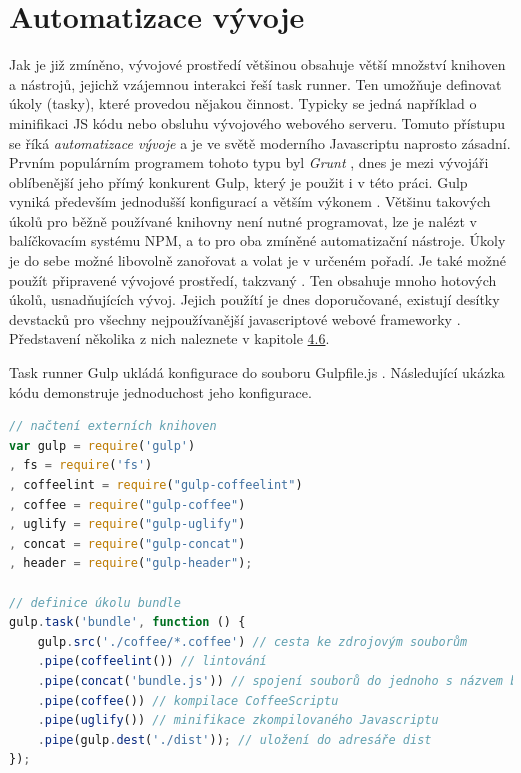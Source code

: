 \section{Automatizace vývoje}
\label{sec:task_runner}
Jak je již zmíněno, vývojové prostředí většinou obsahuje větší množství knihoven a nástrojů, jejichž vzájemnou interakci řeší task runner. Ten umožňuje definovat úkoly (tasky), které provedou nějakou činnost. Typicky se jedná například o minifikaci JS kódu nebo obsluhu vývojového webového serveru. Tomuto přístupu se říká \textit{automatizace vývoje} a je ve světě moderního Javascriptu naprosto zásadní. Prvním populárním programem tohoto typu byl \textit{Grunt} \cite{grunt}, dnes je mezi vývojáři oblíbenější jeho přímý konkurent Gulp, který je použit i v této práci. Gulp vyniká především jednodušší konfigurací a větším výkonem \cite{gulp}. Většinu takových úkolů pro běžně používané knihovny není nutné programovat, lze je nalézt v balíčkovacím systému NPM, a to pro oba zmíněné automatizační nástroje. Úkoly je do sebe možné libovolně zanořovat a volat je v určeném pořadí.  Je také možné použít připravené vývojové prostředí, takzvaný . Ten obsahuje mnoho hotových úkolů, usnadňujících vývoj. Jejich použítí je dnes doporučované, existují desítky devstacků pro všechny nejpoužívanější javascriptové webové frameworky \cite{task_runners}. Představení několika z nich naleznete v kapitole \hyperref[sec:devstacks]{4.6}.

\vspace{3mm}
\noindent Task runner Gulp ukládá konfigurace do souboru Gulpfile.js \cite{gulp} \cite{gulp_web}. Následující ukázka kódu demonstruje jednoduchost jeho konfigurace.

\begin{lstlisting}[language=Javascript,caption={Ukázka konfigurace task runneru Gulp \cite{gulp}}]
// načtení externích knihoven
var gulp = require('gulp')
, fs = require('fs')
, coffeelint = require("gulp-coffeelint")
, coffee = require("gulp-coffee")
, uglify = require("gulp-uglify")
, concat = require("gulp-concat")
, header = require("gulp-header");
 
// definice úkolu bundle
gulp.task('bundle', function () {
    gulp.src('./coffee/*.coffee') // cesta ke zdrojovým souborům
    .pipe(coffeelint()) // lintování
    .pipe(concat('bundle.js')) // spojení souborů do jednoho s názvem bundle.js
    .pipe(coffee()) // kompilace CoffeeScriptu
    .pipe(uglify()) // minifikace zkompilovaného Javascriptu
    .pipe(gulp.dest('./dist')); // uložení do adresáře dist
});
\end{lstlisting}

